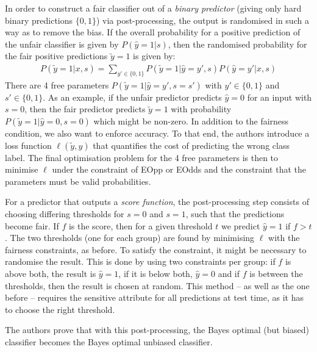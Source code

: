 In order to construct a fair classifier out of a \emph{binary predictor} (giving only hard binary
predictions $\{0, 1\}$) via post-processing, the output is randomised in such a way as to remove
the bias. If the overall probability for a positive prediction of the unfair classifier is given by
\(P(\hat{y}=1|s)\), then the randomised probability for the fair positive predictions \(\tilde{y} =
1\) is given by: \begin{align} \label{eq:hardt} P(\tilde{y}=1| x, s) = \sum\limits_{y' \in \{0,
1\}} P(\tilde{y} = 1| \hat{y}=y', s) P(\hat{y}=y'| x, s) \end{align} There are 4 free parameters
\(P(\tilde{y} = 1| \hat{y}=y', s=s')\) with \(y' \in \{0, 1\}\) and \(s' \in \{0, 1\}\). As an
example, if the unfair predictor predicts \(\hat{y} =0\) for an input with \(s=0\), then the fair
predictor predicts \(\tilde{y} =1\) with probability \(P(\tilde{y} = 1| \hat{y}=0, s=0)\) which
might be non-zero. In addition to the fairness condition, we also want to enforce accuracy. To that
end, the authors introduce a loss function \(\ell (\tilde{y}, y)\) that quantifies the cost of
predicting the wrong class label. The final optimisation problem for the 4 free parameters is then
to minimise \(\ell\) under the constraint of \ac{EOpp} or \ac{EOdds} and the constraint that the
parameters must be valid probabilities.

For a predictor that outputs a \emph{score function}, the post-processing step consists of choosing
differing thresholds for \(s=0\) and \(s=1\), such that the predictions become fair. If \(f\) is
the score, then for a given threshold \(t\) we predict \(\hat{y} = 1\) if \(f > t\). The two
thresholds (one for each group) are found by minimising \(\ell\) with the fairness constraints, as
before. To satisfy the constraint, it might be necessary to randomise the result. This is done by
using two constraints per group: if \(f\) is above both, the result is \(\hat{y} = 1\), if it is
below both, \(\hat{y} =0\) and if \(f\) is between the thresholds, then the result is chosen at
random. This method -- as well as the one before -- requires the sensitive attribute for all
predictions at test time, as it has to choose the right threshold.

The authors prove that with this post-processing, the Bayes optimal (but biased) classifier becomes
the Bayes optimal unbiased classifier.


